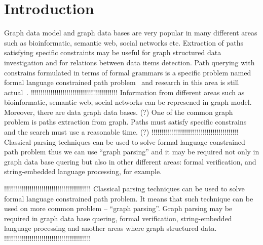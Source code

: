\documentclass{sig-alternate} %
\begin{document}
\section{Introduction}
Graph data model and graph data bases are very popular in many different areas such as bioinformatic, semantic web, social networks etc.
Extraction of paths satisfying specific constraints may be useful for graph structured data investigation and for relations between data items detection.
Path querying with constrains formulated in terms of formal grammars is a specific problem named formal language constrained path problem~\cite{FLCpathProblem} and research in this area is still actual~\cite{DirOfBigGraphAnalysis}.
!!!!!!!!!!!!!!!!!!!!!!!!!!!!!!!!!!!!!!!!!!!!
Information from different areas such as bioinformatic, semantic web, social networks can be represened in graph model. Moreover, there are data graph data bases. (?) One of the common graph problem is paths extraction from graph. Paths must satisfy specific constrains and the search must use a reasonable time. (?)     
!!!!!!!!!!!!!!!!!!!!!!!!!!!!!!!!!!!!!!!!!!!!
Classical parsing techniques can be used to solve formal language constrained path problem thus we can use ``graph parsing'' and it may be required not only in graph data base quering but also in other 
different areas: formal verification, and string-embedded language processing, for example. 

!!!!!!!!!!!!!!!!!!!!!!!!!!!!!!!!!!!!!!!!!!!!
Classical parsing techniques can be used to solve formal language constrained path problem. It means that such technique can be used on more common problem -- ``graph parsing''. Graph parsing may be required in graph data base quering, formal verification, string-embedded language processing and another areas where graph structured data. 
!!!!!!!!!!!!!!!!!!!!!!!!!!!!!!!!!!!!!!!!!!!!
\end{document}

